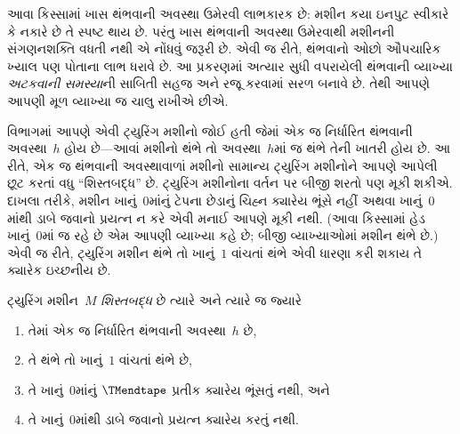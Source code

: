 \begin{explain}
આવા કિસ્સામાં ખાસ થંભવાની અવસ્થા ઉમેરવી લાભકારક છે:
મશીન કયા ઇનપુટ સ્વીકારે કે નકારે છે તે સ્પષ્ટ થાય છે.
પરંતુ ખાસ થંભવાની અવસ્થા ઉમેરવાથી મશીનની સંગણનશક્તિ
વધતી નથી એ નોંધવું જરૂરી છે. એવી જ રીતે, થંભવાનો
ઓછો ઔપચારિક ખ્યાલ પણ પોતાના લાભ ધરાવે છે. આ
પ્રકરણમાં અત્યાર સુધી વપરાયેલી થંભવાની વ્યાખ્યા
\emph{અટકવાની સમસ્યા}ની સાબિતી સહજ અને રજૂ કરવામાં
સરળ બનાવે છે. તેથી આપણે આપણી મૂળ વ્યાખ્યા જ
ચાલુ રાખીએ છીએ.
\end{explain}
\endgroup


\begingroup
\makeatletter{}\makeatother

\label{guunit:OLP-0260}


\begin{explain}
 વિભાગમાં આપણે એવી ટ્યુરિંગ મશીનો
જોઈ હતી જેમાં એક જ નિર્ધારિત થંભવાની અવસ્થા~$h$
હોય છે---આવાં મશીનો થંભે તો અવસ્થા~$h$માં જ થંભે
તેની ખાતરી હોય છે. આ રીતે, એક જ થંભવાની અવસ્થાવાળાં
મશીનો સામાન્ય ટ્યુરિંગ મશીનોને આપણે આપેલી છૂટ કરતાં
વધુ ``શિસ્તબદ્ધ'' છે. ટ્યુરિંગ મશીનોના વર્તન પર બીજી
શરતો પણ મૂકી શકીએ. દાખલા તરીકે, મશીન ખાનું~$0$માંનું
ટેપના છેડાનું ચિહ્ન ક્યારેય ભૂંસે નહીં અથવા ખાનું~$0$માંથી
ડાબે જવાનો પ્રયત્ન ન કરે એવી મનાઈ આપણે મૂકી નથી.
(આવા કિસ્સામાં હેડ ખાનું~$0$માં જ રહે છે એમ આપણી
વ્યાખ્યા કહે છે; બીજી વ્યાખ્યાઓમાં મશીન થંભે છે.)
એવી જ રીતે, ટ્યુરિંગ મશીન થંભે તો ખાનું~$1$ વાંચતાં
થંભે એવી ધારણા કરી શકાય તે ક્યારેક ઇચ્છનીય છે.
\end{explain}

\begin{defn}
ટ્યુરિંગ મશીન~$M$ \emph{શિસ્તબદ્ધ} છે ત્યારે અને
ત્યારે જ જ્યારે
\begin{enumerate}
    \item તેમાં એક જ નિર્ધારિત થંભવાની અવસ્થા~$h$ છે,
    \item તે થંભે તો ખાનું~$1$ વાંચતાં થંભે છે,
    \item તે ખાનું~$0$માંનું $\TMendtape$ પ્રતીક ક્યારેય
    ભૂંસતું નથી, અને
    \item તે ખાનું~$0$માંથી ડાબે જવાનો પ્રયત્ન ક્યારેય
    કરતું નથી.
\end{enumerate}
\end{defn}

